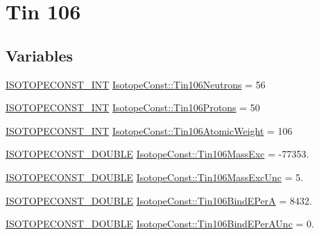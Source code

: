 \hypertarget{group___isotope_const-_tin-_sn106}{}\section{Tin 106}
\label{group___isotope_const-_tin-_sn106}
\subsection*{Variables}
\begin{DoxyCompactItemize}
\item 
\mbox{\hyperlink{group___isotope_const-_macros_ga5f18360b3e99483a35c32d789e62621c}{I\+S\+O\+T\+O\+P\+E\+C\+O\+N\+S\+T\+\_\+\+I\+NT}} \mbox{\hyperlink{group___isotope_const-_tin-_sn106_ga97d8f519a1bf3235ee76bcdc30ed5ff5}{Isotope\+Const\+::\+Tin106\+Neutrons}} = 56
\item 
\mbox{\hyperlink{group___isotope_const-_macros_ga5f18360b3e99483a35c32d789e62621c}{I\+S\+O\+T\+O\+P\+E\+C\+O\+N\+S\+T\+\_\+\+I\+NT}} \mbox{\hyperlink{group___isotope_const-_tin-_sn106_ga03a401948ad94aa92b0a7a37551ab842}{Isotope\+Const\+::\+Tin106\+Protons}} = 50
\item 
\mbox{\hyperlink{group___isotope_const-_macros_ga5f18360b3e99483a35c32d789e62621c}{I\+S\+O\+T\+O\+P\+E\+C\+O\+N\+S\+T\+\_\+\+I\+NT}} \mbox{\hyperlink{group___isotope_const-_tin-_sn106_ga2594415444d4d631cde9a1f736209f48}{Isotope\+Const\+::\+Tin106\+Atomic\+Weight}} = 106
\item 
\mbox{\hyperlink{group___isotope_const-_macros_ga8f45a7272ce02c0b4c65c44636ed719a}{I\+S\+O\+T\+O\+P\+E\+C\+O\+N\+S\+T\+\_\+\+D\+O\+U\+B\+LE}} \mbox{\hyperlink{group___isotope_const-_tin-_sn106_ga4bf66f092af72ca73167733a544dea53}{Isotope\+Const\+::\+Tin106\+Mass\+Exc}} = -\/77353.
\item 
\mbox{\hyperlink{group___isotope_const-_macros_ga8f45a7272ce02c0b4c65c44636ed719a}{I\+S\+O\+T\+O\+P\+E\+C\+O\+N\+S\+T\+\_\+\+D\+O\+U\+B\+LE}} \mbox{\hyperlink{group___isotope_const-_tin-_sn106_gae7cfbc2d4ca024cef1359571b1a51098}{Isotope\+Const\+::\+Tin106\+Mass\+Exc\+Unc}} = 5.
\item 
\mbox{\hyperlink{group___isotope_const-_macros_ga8f45a7272ce02c0b4c65c44636ed719a}{I\+S\+O\+T\+O\+P\+E\+C\+O\+N\+S\+T\+\_\+\+D\+O\+U\+B\+LE}} \mbox{\hyperlink{group___isotope_const-_tin-_sn106_ga6a3f782d0348a9453335893a39430ee6}{Isotope\+Const\+::\+Tin106\+Bind\+E\+PerA}} = 8432.
\item 
\mbox{\hyperlink{group___isotope_const-_macros_ga8f45a7272ce02c0b4c65c44636ed719a}{I\+S\+O\+T\+O\+P\+E\+C\+O\+N\+S\+T\+\_\+\+D\+O\+U\+B\+LE}} \mbox{\hyperlink{group___isotope_const-_tin-_sn106_ga8c5e50fe7b372ff94d715aa22a4c95c6}{Isotope\+Const\+::\+Tin106\+Bind\+E\+Per\+A\+Unc}} = 0.

\end{DoxyCompactItemize}
